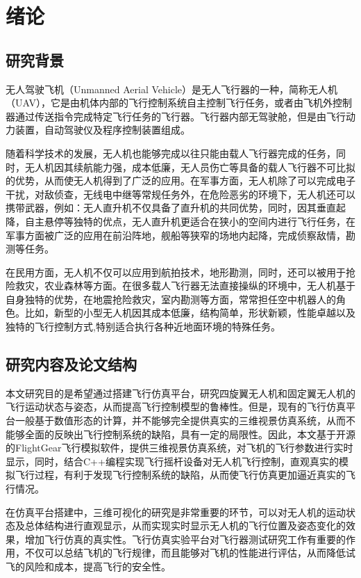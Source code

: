 ﻿\chapter{绪论}\label{preface}

\section{研究背景}
无人驾驶飞机（Unmanned Aerial Vehicle）是无人飞行器的一种，简称无人机（UAV），它是由机体内部的飞行控制系统自主控制飞行任务，或者由飞机外控制器通过传送指令完成特定飞行任务的飞行器。飞行器内部无驾驶舱，但是由飞行动力装置，自动驾驶仪及程序控制装置组成。

随着科学技术的发展，无人机也能够完成以往只能由载人飞行器完成的任务，同时，无人机因其续航能力强，成本低廉，无人员伤亡等具备的载人飞行器不可比拟的优势，从而使无人机得到了广泛的应用。在军事方面，无人机除了可以完成电子干扰，对敌侦查，无线电中继等常规任务外，在危险恶劣的环境下，无人机还可以携带武器，例如：无人直升机不仅具备了直升机的共同优势，同时，因其垂直起降，自主悬停等独特的优点，无人直升机更适合在狭小的空间内进行飞行任务，在军事方面被广泛的应用在前沿阵地，舰船等狭窄的场地内起降，完成侦察敌情，勘测等任务。

在民用方面，无人机不仅可以应用到航拍技术，地形勘测，同时，还可以被用于抢险救灾，农业森林等方面。在很多载人飞行器无法直接操纵的环境中，无人机基于自身独特的优势，在地震抢险救灾，室内勘测等方面，常常担任空中机器人的角色。比如，新型的小型无人机因其成本低廉，结构简单，形状新颖，性能卓越以及独特的飞行控制方式,特别适合执行各种近地面环境的特殊任务。

\section{研究内容及论文结构}
本文研究目的是希望通过搭建飞行仿真平台，研究四旋翼无人机和固定翼无人机的飞行运动状态与姿态，从而提高飞行控制模型的鲁棒性。但是，现有的飞行仿真平台一般基于数值形态的计算，并不能够完全提供真实的三维视景仿真系统，从而不能够全面的反映出飞行控制系统的缺陷，具有一定的局限性。因此，本文基于开源的FlightGear飞行模拟软件，提供三维视景仿真系统，对飞机的飞行参数进行实时显示，同时，结合C++编程实现飞行摇杆设备对无人机飞行控制，直观真实的模拟飞行过程，有利于发现飞行控制系统的缺陷，从而使飞行仿真更加逼近真实的飞行情况。

在仿真平台搭建中，三维可视化的研究是非常重要的环节，可以对无人机的运动状态及总体结构进行直观显示，从而实现实时显示无人机的飞行位置及姿态变化的效果，增加飞行仿真的真实性。飞行仿真实验平台对飞行器测试研究工作有重要的作用，不仅可以总结飞机的飞行规律，而且能够对飞机的性能进行评估，从而降低试飞的风险和成本，提高飞行的安全性。

